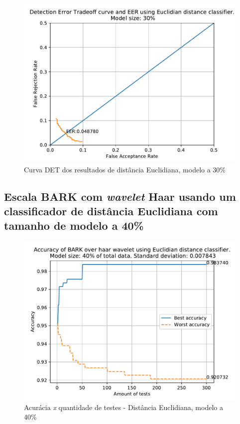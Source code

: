 			\begin{figure}[H]
				\centering
				\includegraphics[width=.6\linewidth]{images/results/det/DET_for_classifier_Euclidian_30}
				\caption{Curva DET dos resultados de distância Euclidiana, modelo a 30\%}
				\label{fig:detforclassifiereuclidian30}
			\end{figure}

			\FloatBarrier
		\subsection{Escala BARK com \textit{wavelet} Haar usando um classificador de distância Euclidiana com tamanho de modelo a 40\%}
		
			
			
			\begin{figure}[ht]
				\centering
				\includegraphics[width=.6\linewidth]{images/results/confusionMatrices/classifier_Euclidian_40}
				\caption{Acurácia \textit{x} quantidade de testes - Distância Euclidiana, modelo a 40\%}
				\label{fig:classifiereuclidian40}
			\end{figure}
		
